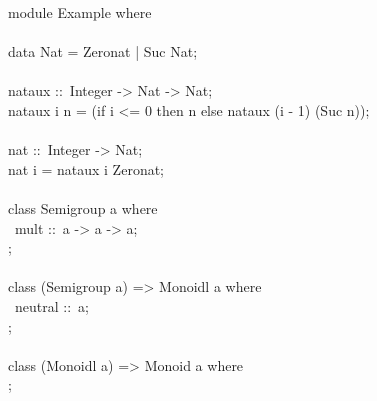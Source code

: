 \begin{isabellebody}
\isamarkuptrue%
%
\isadelimquote
%
\endisadelimquote
%
\isatagquote
%
\begin{isamarkuptext}%
\isatypewriter%
\noindent%
\hspace*{0pt}module Example where {}\\
\hspace*{0pt}\\
\hspace*{0pt}data Nat = Zero{}nat | Suc Nat;\\
\hspace*{0pt}\\
\hspace*{0pt}nat{}aux ::~Integer -> Nat -> Nat;\\
\hspace*{0pt}nat{}aux i n = (if i <= 0 then n else nat{}aux (i - 1) (Suc n));\\
\hspace*{0pt}\\
\hspace*{0pt}nat ::~Integer -> Nat;\\
\hspace*{0pt}nat i = nat{}aux i Zero{}nat;\\
\hspace*{0pt}\\
\hspace*{0pt}class Semigroup a where {}\\
\hspace*{0pt} ~mult ::~a -> a -> a;\\
\hspace*{0pt}{\char125};\\
\hspace*{0pt}\\
\hspace*{0pt}class (Semigroup a) => Monoidl a where {}\\
\hspace*{0pt} ~neutral ::~a;\\
\hspace*{0pt}{\char125};\\
\hspace*{0pt}\\
\hspace*{0pt}class (Monoidl a) => Monoid a where {}\\
\hspace*{0pt}{\char125};\\
\hspace*{0pt}\\

\end{isamarkuptext}
\end{isabellebody}
